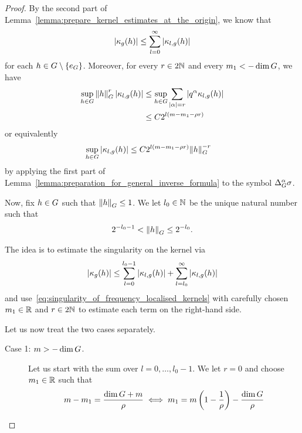 \begin{proof}
    By the second part of Lemma~\ref{lemma:prepare_kernel_estimates_at_the_origin},
    we know that
    \begin{align*}
        \abs {\kappa_g(h)} \leq \sum_{l = 0}^\infty \abs{\kappa_{l, g}(h)}
    \end{align*}
    for each $h \in \Group \setminus \{e_\Group\}$.
    Moreover,
    for every $r \in 2 \N$ and every $m_1 < -\dim \Group$,
    we have
    \begin{align}
        \sup_{h \in \Group} \norm [\Group] h^{r} \abs{\kappa_{l, g}(h)}
        &\leq \sup_{h \in \Group} \sum_{\abs \alpha = r} \abs{q^\alpha \kappa_{l, g}(h)} \notag\\
        &\leq C 2^{l(m - m_1 - \rho r)}
        \label{eq:singularity_of_frequency_localised_kernels}
    \end{align}
    or equivalently
    \begin{align}
        \sup_{h \in \Group} \abs{\kappa_{l, g}(h)}
        &\leq C 2^{l(m - m_1 - \rho r)} \norm [\Group] h^{-r}
        \label{eq:singularity_of_frequency_localised_kernels:2}
    \end{align}
    by applying the first part of Lemma~\ref{lemma:preparation_for_general_inverse_formula} to the symbol $\DifferenceOperatorOrder \alpha \sigma$.

    Now, fix $h \in \Group$ such that $\norm [\Group] h \leq 1$.
    We let $l_0 \in \N$ be the unique natural number such that
    \begin{align*}
        2^{-l_0 - 1} < \norm [\Group] h \leq 2^{-l_0}.
    \end{align*}

    The idea is to estimate the singularity on the kernel via
    \begin{align*}
        \abs {\kappa_g(h)} \leq \sum_{l = 0}^{l_0 - 1} \abs{\kappa_{l, g}(h)} + \sum_{l = l_0}^\infty \abs{\kappa_{l, g}(h)}
    \end{align*}
    and use~\eqref{eq:singularity_of_frequency_localised_kernels} with carefully chosen $m_1 \in \R$ and $r \in 2 \N$ to estimate each term on the right-hand side.

    Let us now treat the two cases separately.
    \begin{description}
        \item[Case 1: $m > -\dim \Group$.]
            Let us start with the sum over $l = 0, \dots, l_0 - 1$.
            We let $r = 0$ and choose $m_1 \in \R$ such that
            \begin{align*}
                m - m_1 = \frac {\dim \Group + m} \rho \iff m_1 = m\left(1 - \frac 1 \rho\right) - \frac {\dim \Group} \rho
            \end{align*}


\end{description}
\end{proof}
